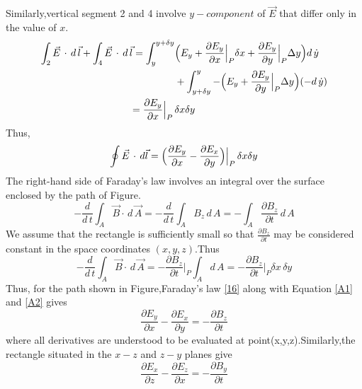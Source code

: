 \documentclass[12pt]{article}
\numberwithin{equation}{section}
\begin{document}
Similarly,vertical segment 2 and 4 involve $y-component$ of $\vec{E}$ that differ only in the value of $x$.
\newpage
\[
\begin{split}
    \int_2 \vec{E}\,\cdot\,d\,\vec{l}+\int_4 \vec{E}\,\cdot\,d\,\vec{l}=\int_{y}^{y+\delta y}&\Bigl(E_y+\frac{\partial{E_y}}{\partial{x}}\Big|_P\delta x+\frac{\partial{E_y}}{\partial{y}}\Big|_P \Delta y\Bigl)d\,\dot{y}\\
    &+\int_{y+\delta y}^{y}-\Bigl(E_y+\frac{\partial{E_y}}{\partial{y}}\Big|_P\Delta y\Bigl)(-d\,\dot{y})\\
    =\frac{\partial{E_y}}{\partial{x}}\Big|_P\,&\delta x\delta y
\end{split}
\]
Thus,
\\
\begin{equation}
    \oint \vec{E}\,\cdot\,d\vec{l}=\Bigl(\frac{\partial{E_y}}{\partial{x}}-\frac{\partial{E_x}}{\partial{y}}\Bigl)\Big|_P\,\delta x\delta y\label{A1}
\end{equation}
\indent The right-hand side of Faraday's law involves an integral over the surface enclosed by the path of Figure.
\[
    -\frac{d}{d\,t}\int_A \vec{B}\cdot\,d\,\vec{A}=-\frac{d}{d\,t}\int_A B_z\,d\,A=-\int_A\frac{\partial{B_z}}{\partial{t}}\,d\,A
\]
We assume that the rectangle is sufficiently small so that $\frac{\partial{B_z}}{\partial{t}}$ may be considered constant in the space coordinates $(x,y,z)$.Thus
\begin{equation}
    -\frac{d}{d\,t}\int_A \vec{B}\cdot\,d\,\vec{A}=-\frac{\partial{B_z}}{\partial{t}}\Big|_P\int_A d\,A=-\frac{\partial{B_z}}{\partial{t}}\Big|_P\delta x\,\delta y\label{A2}
\end{equation}
Thus, for the path shown in Figure,Faraday's law \eqref{16} along with Equation \eqref{A1} and \eqref{A2} gives
\begin{equation}
    \frac{\partial{E_y}}{\partial{x}}-\frac{\partial{E_x}}{\partial{y}}=-\frac{\partial{B_z}}{\partial{t}}\label{A3}
\end{equation}
where all derivatives are understood to be evaluated at point(x,y,z).Similarly,the rectangle situated in the $x-z$ and $z-y$ planes give
\begin{equation}
    \frac{\partial{E_x}}{\partial{z}}-\frac{\partial{E_z}}{\partial{x}}=-\frac{\partial{B_y}}{\partial{t}}\label{A4}
\end{equation}
\end{document}
